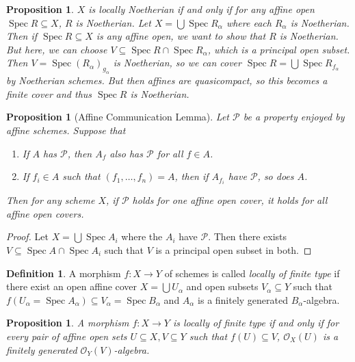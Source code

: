 \documentclass[leqno, openany]{memoir}
\newtheorem{prop}[thm]{Proposition}
\theoremstyle{definition}
\newtheorem{defn}[thm]{Definition}
\theoremstyle{remark}
\theoremstyle{plain}
\theoremstyle{definition}
\theoremstyle{remark}
\newcommand{\mc}[1]{\mathcal{#1}}
\newcommand{\msc}[1]{\mathscr{#1}}
\DeclareMathOperator{\Spec}{Spec}
\begin{document}
\begin{prop}
    $X$ is locally Noetherian if and only if for any affine open $\Spec R \subseteq X$, $R$ is Noetherian. Let $X = \bigcup \Spec R_{\alpha}$ where each $R_{\alpha}$ is Noetherian. Then if $\Spec R \subseteq X$ is any affine open, we want to show that $R$ is Noetherian. But here, we can choose $V \subseteq \Spec R \cap \Spec R_{\alpha}$, which is a principal open subset. Then $V = \Spec { (R_{\alpha}) }_{g_{\alpha}}$ is Noetherian, so we can cover $\Spec R = \bigcup \Spec R_{f_{\alpha}}$ by Noetherian schemes. But then affines are quasicompact, so this becomes a finite cover and thus $\Spec R$ is Noetherian.
\end{prop}

\begin{prop}[Affine Communication Lemma]
    Let $\mc{P}$ be a property enjoyed by affine schemes. Suppose that
    \begin{enumerate}
        \item If $A$ has $\mc{P}$, then $A_f$ also has $\mc{P}$ for all $f \in A$.
        \item If $f_i \in A$ such that $(f_1, \ldots, f_n) = A$, then if $A_{f_i}$ have $\mc{P}$, so does $A$.
    \end{enumerate}
    Then for any scheme $X$, if $\mc{P}$ holds for one affine open cover, it holds for all affine open covers.
\end{prop}

\begin{proof}
    Let $X = \bigcup \Spec A_i$ where the $A_i$ have $\mc{P}$. Then there exists $V \subseteq \Spec A \cap \Spec A_i$ such that $V$ is a principal open subset in both.
\end{proof}

\begin{defn}
    A morphism $f \colon X \to Y$ of schemes is called \textit{locally of finite type} if there exist an open affine cover $X = \bigcup U_{\alpha}$ and open subsets $V_{\alpha} \subseteq Y$ such that $f(U_{\alpha} = \Spec A_{\alpha}) \subseteq V_{\alpha} = \Spec B_{\alpha}$ and $A_{\alpha}$ is a finitely generated $B_{\alpha}$-algebra.
\end{defn}

\begin{prop}
    A morphism $f \colon X \to Y$ is locally of finite type if and only if for every pair of affine open sets $U \subseteq X, V \subseteq Y$ such that $f(U) \subseteq V$, $\msc{O}_X(U)$ is a finitely generated $\msc{O}_Y(V)$-algebra.
\end{prop}
\end{document}
